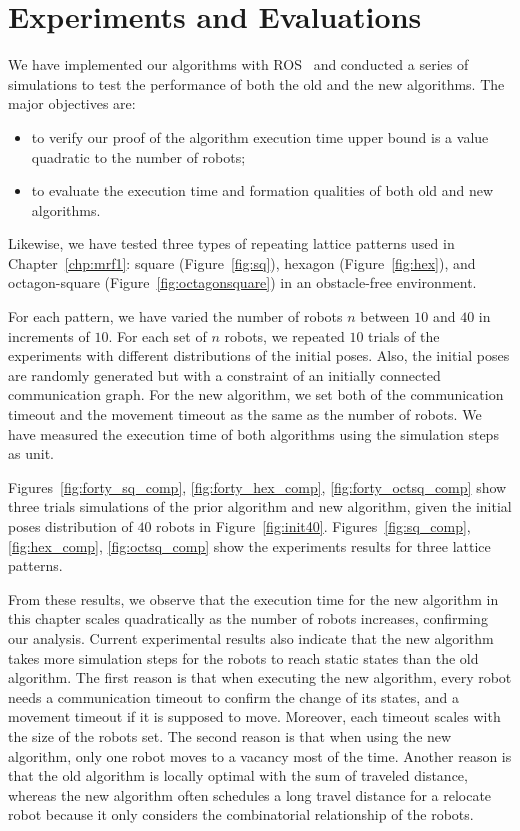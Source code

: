 \section{Experiments and Evaluations}
\label{sec:exp}
We have implemented our algorithms with ROS~\cite{QuiConGerFauFooLeiWheNg09} and conducted a series of simulations to test the performance of both the old and the new algorithms. 
%
The major objectives are:
\begin{itemize}
\item to verify our proof of the algorithm execution time upper bound is a value quadratic to the number of robots;
\item to evaluate the execution time and formation qualities of both old and new algorithms.
\end{itemize} 
 
 
Likewise, we have tested three types of repeating lattice patterns used in Chapter~\ref{chp:mrf1}:
square (Figure~\ref{fig:sq}), hexagon (Figure~\ref{fig:hex}), and octagon-square (Figure~\ref{fig:octagonsquare}) in an obstacle-free environment.
  
  
For each pattern, we have varied the number of robots $n$ between $10$ and $40$ in increments of $10$. 
%
For each set of $n$ robots, we repeated $10$ trials of the experiments with different distributions
of the initial poses. 
%
Also, the initial poses are randomly generated but with a constraint of an initially connected communication graph. 
%
For the new algorithm, we set both of the communication timeout and the movement timeout as the same as the number of robots. 
%
We have measured the execution time of both algorithms using the simulation steps as unit. 



Figures~\ref{fig:forty_sq_comp}, \ref{fig:forty_hex_comp}, \ref{fig:forty_octsq_comp} show three trials simulations of the prior algorithm and new algorithm, given the initial poses distribution of $40$ robots in Figure~\ref{fig:init40}. 
%
Figures~\ref{fig:sq_comp}, \ref{fig:hex_comp}, \ref{fig:octsq_comp} show the experiments results for three lattice patterns.

From these results, we observe that the execution time for the new
algorithm in this chapter scales quadratically as the number of robots increases,
confirming our analysis.  
  Current experimental results also indicate that
  the new algorithm takes more simulation steps for the robots to reach
  static states than the old algorithm. 
  The first reason is that when
  executing the new algorithm, every robot needs a communication timeout
  to confirm the change of its states, and a movement timeout if it is
  supposed to move. 
  Moreover, each timeout scales with the size of the
  robots set. 
  The second reason is that when using the new algorithm,
  only one robot moves to a vacancy most of the time. 
  Another reason is
  that the old algorithm is locally optimal with the sum of traveled
  distance, whereas the new algorithm often schedules a long travel distance for a relocate robot because it only considers the combinatorial relationship of the robots.
  
